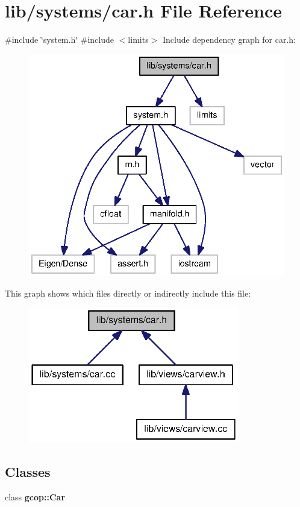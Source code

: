 \section{lib/systems/car.h \-File \-Reference}
\label{car_8h}
{\ttfamily \#include \char`\"{}system.\-h\char`\"{}}\*
{\ttfamily \#include $<$limits$>$}\*
\-Include dependency graph for car.\-h\-:\nopagebreak
\begin{figure}[H]
\begin{center}
\leavevmode
\includegraphics[width=336pt]{car_8h__incl}
\end{center}
\end{figure}
\-This graph shows which files directly or indirectly include this file\-:\nopagebreak
\begin{figure}[H]
\begin{center}
\leavevmode
\includegraphics[width=260pt]{car_8h__dep__incl}
\end{center}
\end{figure}
\subsection*{\-Classes}
\begin{DoxyCompactItemize}
\item 
class {\bf gcop\-::\-Car}
\end{DoxyCompactItemize}

